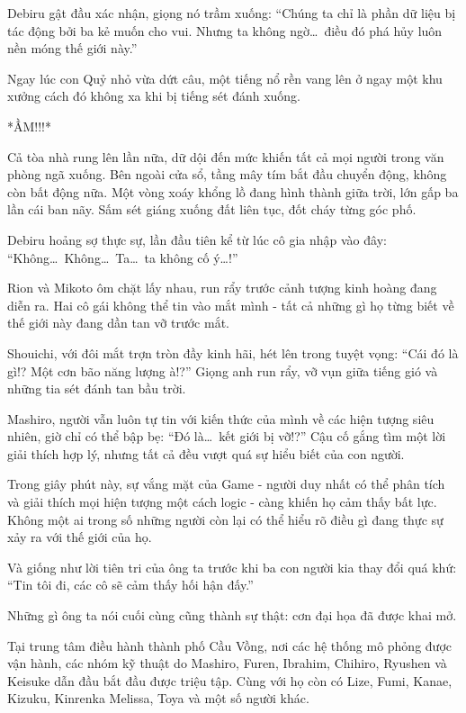 \documentclass[../main.tex]{subfiles}
\begin{document}
Debiru gật đầu xác nhận, giọng nó trầm xuống: ``Chúng ta chỉ là phần dữ liệu bị tác động bởi ba kẻ muốn cho vui. Nhưng ta không ngờ\dots\ điều đó phá hủy luôn nền móng thế giới này.''

Ngay lúc con Quỷ nhỏ vừa dứt câu, một tiếng nổ rền vang lên ở ngay một khu xưởng cách đó không xa khi bị tiếng sét đánh xuống.

*ẦM!!!*

Cả tòa nhà rung lên lần nữa, dữ dội đến mức khiến tất cả mọi người trong văn phòng ngã xuống. Bên ngoài cửa sổ, tầng mây tím bắt đầu chuyển động,  không còn bất động nữa. Một vòng xoáy khổng lồ đang hình thành giữa trời, lớn gấp ba lần cái ban nãy. Sấm sét giáng xuống đất liên tục, đốt cháy từng góc phố.

Debiru hoảng sợ thực sự, lần đầu tiên kể từ lúc cô gia nhập vào đây: ``Không\dots\ Không\dots\ Ta\dots\ ta không cố ý\dots!''

Rion và Mikoto ôm chặt lấy nhau, run rẩy trước cảnh tượng kinh hoàng đang diễn ra. Hai cô gái không thể tin vào mắt mình - tất cả những gì họ từng biết về thế giới này đang dần tan vỡ trước mắt.

Shouichi, với đôi mắt trợn tròn đầy kinh hãi, hét lên trong tuyệt vọng: ``Cái đó là gì!? Một cơn bão năng lượng à!?'' Giọng anh run rẩy, vỡ vụn giữa tiếng gió và những tia sét đánh tan bầu trời.

Mashiro, người vẫn luôn tự tin với kiến thức của mình về các hiện tượng siêu nhiên, giờ chỉ có thể bập bẹ: ``Đó là\dots\ kết giới bị vỡ!?'' Cậu cố gắng tìm một lời giải thích hợp lý, nhưng tất cả đều vượt quá sự hiểu biết của con người.

Trong giây phút này, sự vắng mặt của Game - người duy nhất có thể phân tích và giải thích mọi hiện tượng một cách logic - càng khiến họ cảm thấy bất lực. Không một ai trong số những người còn lại có thể hiểu rõ điều gì đang thực sự xảy ra với thế giới của họ.

Và giống như lời tiên tri của ông ta trước khi ba con người kia thay đổi quá khứ: ``Tin tôi đi, các cô sẽ cảm thấy hối hận đấy.''

Những gì ông ta nói cuối cùng cũng thành sự thật: cơn đại họa đã được khai mở.

Tại trung tâm điều hành thành phố Cầu Vồng, nơi các hệ thống mô phỏng được vận hành, các nhóm kỹ thuật do Mashiro, Furen, Ibrahim, Chihiro, Ryushen và Keisuke dẫn đầu bắt đầu được triệu tập. Cùng với họ còn có Lize, Fumi, Kanae, Kizuku, Kinrenka Melissa, Toya và một số người khác.
\end{document}
